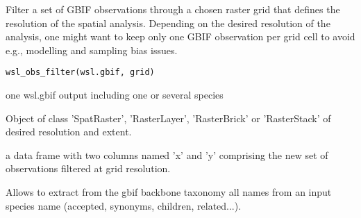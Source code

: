 \documentclass[a4paper]{book}
\begin{document}
%
\begin{Description}\relax
Filter a set of GBIF observations through a chosen raster grid that defines
the resolution of the spatial analysis. Depending on the desired resolution
of the analysis, one might want to keep only one GBIF observation per grid
cell to avoid e.g., modelling and sampling bias issues.
\end{Description}
%
\begin{Usage}
\begin{verbatim}
wsl_obs_filter(wsl.gbif, grid)
\end{verbatim}
\end{Usage}
%
\begin{Arguments}
\begin{ldescription}
\item[\code{wsl.gbif}] one wsl.gbif output including one or several species

\item[\code{grid}] Object of class 'SpatRaster', 'RasterLayer', 'RasterBrick' or
'RasterStack' of desired resolution and extent.
\end{ldescription}
\end{Arguments}
%
\begin{Value}
a data frame with two columns named 'x' and 'y' comprising
the new set of observations filtered at grid resolution.
\end{Value}
%
\begin{Examples}
\end{Examples}
%
\begin{Description}\relax
Allows to extract from the gbif backbone taxonomy all names from an input species name
(accepted, synonyms, children, related...).
\end{Description}
\end{document}
